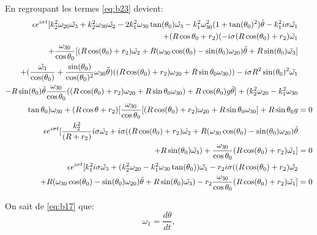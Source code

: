 En regroupant les termes \ref{eq:b23} devient:
\begin{align}
    \epsilon e^{i \sigma t} [k_2^2 \omega_{20} \tilde{\omega_3}+k_2^2 \omega_{30} \tilde{\omega_2} -2k_1^2\omega_{30} \tan(\theta_0)\tilde{\omega_3}
    -k_1^2 \omega_{30}^2(1+\tan(\theta_0)^2)\tilde{\theta} -k_1^2 i \sigma \Tilde{\omega_1} &\nonumber\\
    +(R\cos{\theta_0}+r_2)(-i \sigma( R\cos(\theta_0)+r_2) \Tilde{\omega_1}& \nonumber \\
    +\frac{\omega_{30}}{\cos{\theta_0}} [(R\cos(\theta_0)+r_2) \Tilde{\omega_2} 
    +R(\omega_{30}\cos(\theta_0)-\sin(\theta_0)\omega_{20}) \Tilde{\theta}
    +R\sin(\theta_0) \Tilde{\omega_3} ] & \nonumber \\
    + (\frac{\tilde{\omega_3}}{\cos(\theta_0)}+\frac{\sin(\theta_0)}{\cos(\theta_0)^2}\omega_{30}\tilde{\theta})((R\cos(\theta_0)+r_2)\omega_{20}
    +R \sin{\theta_0}\omega_{30}) )-i \sigma R^2 \sin(\theta_0)^2 \Tilde{\omega_1}& \nonumber \\
    -R\sin(\theta_0)\tilde{\theta}\frac{\omega_{30}}{\cos{\theta_0}}  ((R\cos(\theta_0)+r_2)\omega_{20}+R \sin{\theta_0}\omega_{30})+R\cos(\theta_0)g\tilde{\theta}]+ (k_2^2\omega_{20}-k_1^2\omega_{30}& \nonumber \\
    \tan{\theta_0})\omega_{30}+(R\cos{\theta}+r_2)[
     \frac{\omega_{30}}{\cos{\theta_0}}  [(R\cos(\theta_0)+r_2)\omega_{20}+R \sin{\theta_0}\omega_{30}]+ R\sin{\theta_0}g &=0  \nonumber\\
     \epsilon e^{i \sigma t}[\frac{k_2^2}{(R+r_2)} i \sigma \Tilde{\omega_2}+i \sigma((R\cos(\theta_0)+r_2) \Tilde{\omega_2} +R(\omega_{30}\cos(\theta_0)-\sin(\theta_0)\omega_{20}) \Tilde{\theta}& \nonumber \\
     +R\sin(\theta_0) \Tilde{\omega_3})
    +\frac{\omega_{30}}{\cos{\theta_0}} (R\cos(\theta_0)+r_2) \Tilde{\omega_1}]  &= 0 \nonumber\\
    \epsilon e^{i \sigma t} [k_1^2 i \sigma\Tilde{\omega_3}+ (k_2^2\omega_{20}-k_1^2\omega_{30} \tan(\theta_0)) \Tilde{\omega_1} -r_2 i \sigma ((R\cos(\theta_0)+r_2) \Tilde{\omega_2} &\nonumber\\
    +R(\omega_{30}\cos(\theta_0)-\sin(\theta_0)\omega_{20}) \Tilde{\theta}+R\sin(\theta_0) \Tilde{\omega_3} )- r_2\frac{\omega_{30}}{\cos{\theta_0}} (R\cos(\theta_0)+r_2) \Tilde{\omega_1}] &= 0
  \label{eq:b23b}
\end{align}


On sait de \ref{eq:b17} que:
\begin{equation}
    \omega_1=\frac{d \theta}{dt},
\end{equation}

